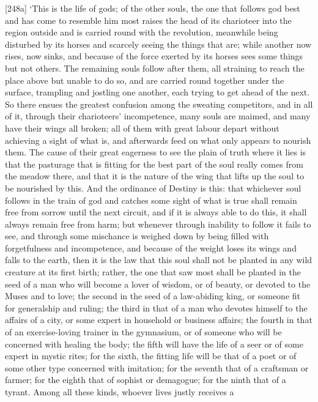 {[}248a{]} ‘This is the life of gods; of the other souls, the one that
follows god best and has come to resemble him most raises the head of
its charioteer into the region outside and is carried round with the
revolution, meanwhile being disturbed by its  horses and
scarcely seeing the things that are; while another now rises, now sinks,
and because of the force exerted by its horses sees some things but not
others. The remaining souls follow after them, all straining to reach
the place above but unable to do so, and are carried round together
under the  surface, trampling and jostling one another, each
trying to get ahead of the next. So there ensues the greatest confusion
among the sweating competitors, and in all of it, through their
charioteers' incompetence, many souls are maimed, and many have their
wings all broken; all of them with great labour depart  without
achieving a sight of what is, and afterwards feed on what only appears
to nourish them. The
cause of their great eagerness to see the plain of truth where it lies
is that the  pasturage that is fitting for the best part of the
soul really comes from
the meadow there, and that it is the nature of the wing that lifts up
the soul to be nourished by this. And the ordinance of
Destiny is this: that
whichever soul follows in the train of god and catches some sight of
what is true shall  remain free from sorrow until the next
circuit, and if it is always able to do this, it shall always remain
free from harm; but whenever through inability to follow it fails to
see, and through some mischance is weighed down by being filled with
forgetfulness and incompetence, and because of the weight loses its
wings and falls to the earth, then it is the law that this soul shall
not be planted in any wild creature at its first
birth; rather, 
the one that saw most shall be planted in the seed of a man who will
become a lover of wisdom, or of beauty, or devoted to the Muses and to
love; the second in the
seed of a law-abiding king, or someone fit for generalship and ruling;
the  third in that of a man who devotes himself to the affairs
of a city, or some expert in household or business affairs; the fourth
in that of an exercise-loving trainer in the gymnasium, or of someone
who will be concerned with healing the body; the fifth will have the
life of a seer or of some expert in mystic rites; for  the
sixth, the fitting life will be that of a
poet or of some other
type concerned with imitation; for the seventh that of a craftsman or
farmer; for the eighth that of sophist or demagogue; for the ninth that
of a tyrant. Among all these kinds, whoever lives justly receives a
